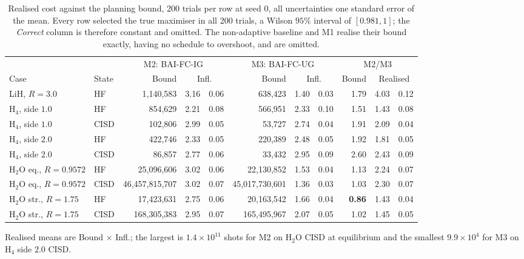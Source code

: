 \documentclass[10pt]{article}
\begin{document}
\begin{table}[!htbp]
\centering
\scriptsize
\caption{Realised cost against the planning bound, 200 trials per row at seed $0$, all uncertainties one standard error of the mean. Every row selected the true maximiser in all 200 trials, a Wilson $95\%$ interval of $[0.981,1]$; the \emph{Correct} column is therefore constant and omitted. The non-adaptive baseline and M1 realise their bound exactly, having no schedule to overshoot, and are omitted.}
\label{tab:finite-shot}
\begin{tabular}{llrr@{\,$\pm$\,}lrr@{\,$\pm$\,}lrr@{\,$\pm$\,}l}
\toprule
& & \multicolumn{3}{c}{M2: BAI-FC-IG} & \multicolumn{3}{c}{M3: BAI-FC-UG} & \multicolumn{3}{c}{M2/M3} \\
\cmidrule(lr){3-5}\cmidrule(lr){6-8}\cmidrule(lr){9-11}
Case & State & Bound & \multicolumn{2}{c}{Infl.} & Bound & \multicolumn{2}{c}{Infl.} & Bound & \multicolumn{2}{c}{Realised} \\
\midrule
LiH, $R{=}3.0$ & HF & 1,140,583 & 3.16 & 0.06 & 638,423 & 1.40 & 0.03 & 1.79 & 4.03 & 0.12 \\
H$_4$, side $1.0$ & HF & 854,629 & 2.21 & 0.08 & 566,951 & 2.33 & 0.10 & 1.51 & 1.43 & 0.08 \\
H$_4$, side $1.0$ & CISD & 102,806 & 2.99 & 0.05 & 53,727 & 2.74 & 0.04 & 1.91 & 2.09 & 0.04 \\
H$_4$, side $2.0$ & HF & 422,746 & 2.33 & 0.05 & 220,389 & 2.48 & 0.05 & 1.92 & 1.81 & 0.05 \\
H$_4$, side $2.0$ & CISD & 86,857 & 2.77 & 0.06 & 33,432 & 2.95 & 0.09 & 2.60 & 2.43 & 0.09 \\
H$_2$O eq., $R{=}0.9572$ & HF & 25,096,606 & 3.02 & 0.06 & 22,130,852 & 1.53 & 0.04 & 1.13 & 2.24 & 0.07 \\
H$_2$O eq., $R{=}0.9572$ & CISD & 46,457,815,707 & 3.02 & 0.07 & 45,017,730,601 & 1.36 & 0.03 & 1.03 & 2.30 & 0.07 \\
H$_2$O str., $R{=}1.75$ & HF & 17,423,631 & 2.75 & 0.06 & 20,163,542 & 1.66 & 0.04 & \textbf{0.86} & 1.43 & 0.04 \\
H$_2$O str., $R{=}1.75$ & CISD & 168,305,383 & 2.95 & 0.07 & 165,495,967 & 2.07 & 0.05 & 1.02 & 1.45 & 0.05 \\
\bottomrule
\end{tabular}
\end{table}

Realised means are Bound $\times$ Infl.; the largest is $1.4\times10^{11}$ shots
for M2 on H$_2$O CISD at equilibrium and the smallest $9.9\times10^{4}$ for M3 on
H$_4$ side $2.0$ CISD.
\end{document}
